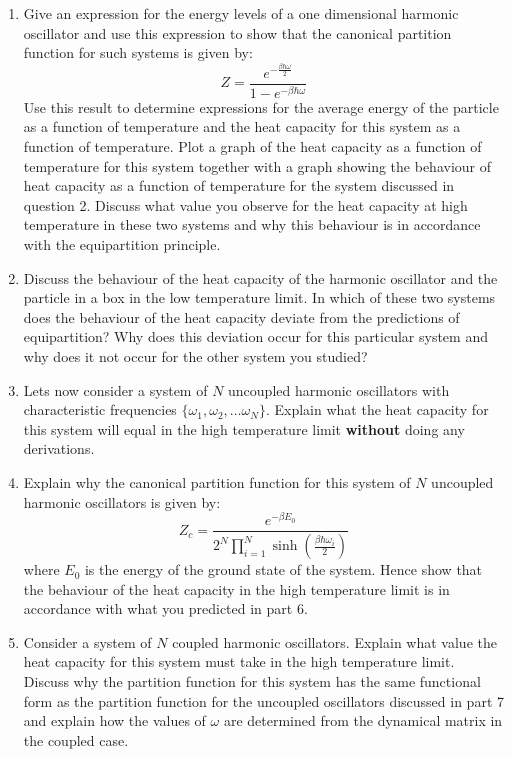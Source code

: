 \documentclass[a4paper]{article}
\begin{document}
\begin{enumerate}
\item Give an expression for the energy levels of a one dimensional harmonic oscillator and use this expression to show that the canonical partition function for such systems is given by:
$$
Z  = \frac{ e^{-\frac{\beta \hbar \omega}{2}} }{ 1 - e^{-\beta \hbar \omega} }
$$
Use this result to determine expressions for the average energy of the particle as a function of temperature and the heat capacity for this system as a function of temperature.  Plot a graph of the heat capacity as a function of temperature for this system together with a graph showing the behaviour of heat capacity as a function of temperature for the system discussed in question 2.  Discuss what value you observe for the heat capacity at high temperature in these two systems and why this behaviour is in accordance with the equipartition principle.

\item Discuss the behaviour of the heat capacity of the harmonic oscillator and the particle in a box in the low temperature limit.  In which of these two systems does the behaviour of the heat capacity deviate from the predictions of equipartition?  Why does this deviation occur for this particular system and why does it not occur for the other system you studied?  

\item Lets now consider a system of $N$ uncoupled harmonic oscillators with characteristic frequencies $\{ \omega_1, \omega_2, \dots \omega_N\}$.  Explain what the heat capacity for this system will equal in the high temperature limit {\bf without} doing any derivations.

\item Explain why the canonical partition function for this system of $N$ uncoupled harmonic oscillators is given by:
$$
Z_c = \frac{e^{-\beta E_0}}{2^N \prod_{i=1}^N \sinh\left( \frac{\beta \hbar \omega_i}{2} \right)}
$$      
where $E_0$ is the energy of the ground state of the system.  Hence show that the behaviour of the heat capacity in the high temperature limit is in accordance with what you predicted in part 6.

\item Consider a system of $N$ coupled harmonic oscillators.  Explain what value the heat capacity for this system must take in the high temperature limit.  Discuss why the partition function for this system has the same functional form as the partition function for the uncoupled oscillators discussed in part 7 and explain how the values of $\omega$ are determined from the dynamical matrix in the coupled case.


\end{enumerate}
\end{document}
